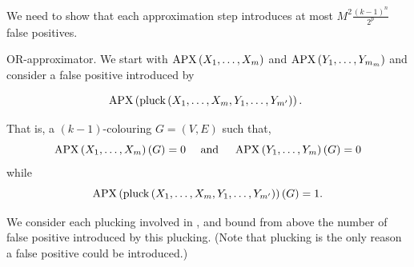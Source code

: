 % 
% 
% 
% 
% 
% 
% 



We need to show that each approximation step introduces at most $M^2 \frac{(k-1)^n}{2^p}$ false positives.


  OR-approximator.
We start with $\mathrm{APX}\left(X_1, \ldots, X_m\right)$ and 
$\operatorname{\mathrm{APX}}\left(Y_1, \ldots, Y_{m_m}\right)$ and consider a false positive introduced by

$$
\operatorname{\mathrm{APX}}\left(\text{pluck}\left(X_1, \ldots, X_m, Y_1, \ldots, Y_{m^{\prime}}\right)\right) \text {. }
$$


That is, a $(k-1)$-colouring $G=(V, E)$ such that,
\begin{equation}\label{eq:991:24}
\operatorname{\mathrm{APX}}\left(X_1, \ldots, X_m\right)(G)=0 
\quad \text{ and } ~~~\operatorname{\mathrm{APX}}\left(Y_1, \ldots, Y_m\right)(G)=0
\end{equation}
while 
\begin{equation}\label{eq:960:30}
\operatorname{\mathrm{APX}}\left(\operatorname{pluck}\left(X_1, \ldots, X_m, Y_1, \ldots, Y_{m^{\prime}}\right)\right)(G)=1 .
\end{equation}

We consider each plucking involved in , and bound from above the number of false positive introduced by this plucking. (Note that plucking is the only reason a false positive could be introduced.)



